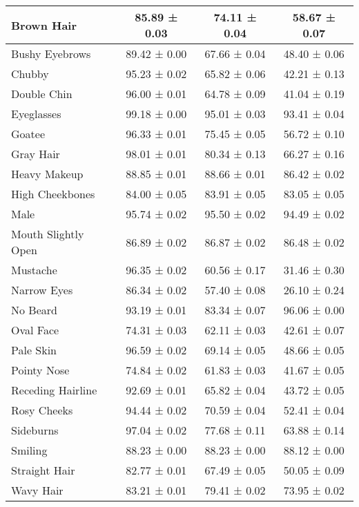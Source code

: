 \begin{table*}[h]
{\begin{tabular}{|l|c|c|c|}
Brown Hair         & 85.89 ± 0.03 & 74.11 ± 0.04 & 58.67 ± 0.07 \\ \hline
Bushy Eyebrows     & 89.42 ± 0.00 & 67.66 ± 0.04 & 48.40 ± 0.06 \\ \hline
Chubby             & 95.23 ± 0.02 & 65.82 ± 0.06 & 42.21 ± 0.13 \\ \hline
Double Chin        & 96.00 ± 0.01 & 64.78 ± 0.09 & 41.04 ± 0.19 \\ \hline
Eyeglasses         & 99.18 ± 0.00 & 95.01 ± 0.03 & 93.41 ± 0.04 \\ \hline
Goatee             & 96.33 ± 0.01 & 75.45 ± 0.05 & 56.72 ± 0.10 \\ \hline
Gray Hair          & 98.01 ± 0.01 & 80.34 ± 0.13 & 66.27 ± 0.16 \\ \hline
Heavy Makeup       & 88.85 ± 0.01 & 88.66 ± 0.01 & 86.42 ± 0.02 \\ \hline
High Cheekbones    & 84.00 ± 0.05 & 83.91 ± 0.05 & 83.05 ± 0.05 \\ \hline
Male               & 95.74 ± 0.02 & 95.50 ± 0.02 & 94.49 ± 0.02 \\ \hline
Mouth Slightly Open& 86.89 ± 0.02 & 86.87 ± 0.02 & 86.48 ± 0.02 \\ \hline
Mustache           & 96.35 ± 0.02 & 60.56 ± 0.17 & 31.46 ± 0.30 \\ \hline
Narrow Eyes        & 86.34 ± 0.02 & 57.40 ± 0.08 & 26.10 ± 0.24 \\ \hline
No Beard           & 93.19 ± 0.01 & 83.34 ± 0.07 & 96.06 ± 0.00 \\ \hline
Oval Face          & 74.31 ± 0.03 & 62.11 ± 0.03 & 42.61 ± 0.07 \\ \hline
Pale Skin          & 96.59 ± 0.02 & 69.14 ± 0.05 & 48.66 ± 0.05 \\ \hline
Pointy Nose        & 74.84 ± 0.02 & 61.83 ± 0.03 & 41.67 ± 0.05 \\ \hline
Receding Hairline  & 92.69 ± 0.01 & 65.82 ± 0.04 & 43.72 ± 0.05 \\ \hline
Rosy Cheeks        & 94.44 ± 0.02 & 70.59 ± 0.04 & 52.41 ± 0.04 \\ \hline
Sideburns          & 97.04 ± 0.02 & 77.68 ± 0.11 & 63.88 ± 0.14 \\ \hline
Smiling            & 88.23 ± 0.00 & 88.23 ± 0.00 & 88.12 ± 0.00 \\ \hline
Straight Hair      & 82.77 ± 0.01 & 67.49 ± 0.05 & 50.05 ± 0.09 \\ \hline
Wavy Hair          & 83.21 ± 0.01 & 79.41 ± 0.02 & 73.95 ± 0.02 \\ \hline

\end{tabular}}
\end{table*}
